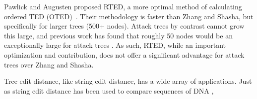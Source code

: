 Pawlick and Augusten proposed RTED, a more optimal method of calculating ordered TED (OTED)~\cite{pawlik_rted_2011}. Their methodology is faster than Zhang and Shasha, but specifically for larger trees (500+ nodes). Attack trees by contrast cannot grow this large, and previous work has found that roughly 50 nodes would be an exceptionally large for attack trees . As such, RTED, while an important optimization and contribution, does not offer a significant advantage for attack trees over Zhang and Shasha.

Tree edit distance, like string edit distance, has a wide array of applications. Just as string edit distance has been used to compare sequences of DNA ,









